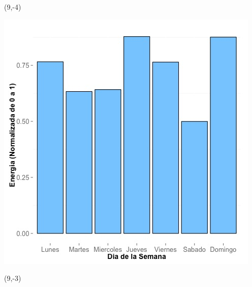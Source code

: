 \documentclass{article}\usepackage[]{graphicx}\usepackage[]{color}
\newenvironment{knitrout}{}{} %
\begin{document}
 \begin{textblock}{1}(9,-4)
\begin{minipage}{20em}
\begingroup

\endgroup
\end{minipage}
\end{textblock}


\begin{knitrout}
\color{fgcolor}
\includegraphics[scale=0.65]{figure/A6_day_of_week_plot} 
\end{knitrout}


 \begin{textblock}{1}(9,-3)
\begin{minipage}{20em}
\begingroup

\endgroup
\end{minipage}
\end{textblock}
\end{document}
